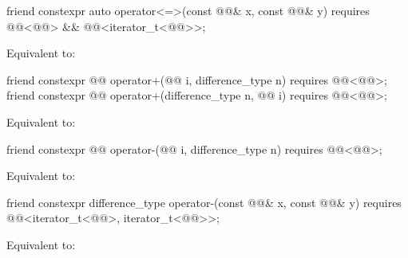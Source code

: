 %
\begin{itemdecl}
friend constexpr auto operator<=>(const @@& x, const @@& y)
  requires @@<@@> && @@<iterator_t<@@>>;
\end{itemdecl}

\begin{itemdescr}
\pnum
\effects
Equivalent to: 
\end{itemdescr}

%
\begin{itemdecl}
friend constexpr @@ operator+(@@ i, difference_type n)
  requires @@<@@>;
friend constexpr @@ operator+(difference_type n, @@ i)
  requires @@<@@>;
\end{itemdecl}

\begin{itemdescr}
\pnum
\effects
Equivalent to: 
\end{itemdescr}

%
\begin{itemdecl}
friend constexpr @@ operator-(@@ i, difference_type n)
  requires @@<@@>;
\end{itemdecl}

\begin{itemdescr}
\pnum
\effects
Equivalent to: 
\end{itemdescr}

%
\begin{itemdecl}
friend constexpr difference_type operator-(const @@& x, const @@& y)
  requires @@<iterator_t<@@>, iterator_t<@@>>;
\end{itemdecl}

\begin{itemdescr}
\pnum
\effects
Equivalent to: 
\end{itemdescr}


